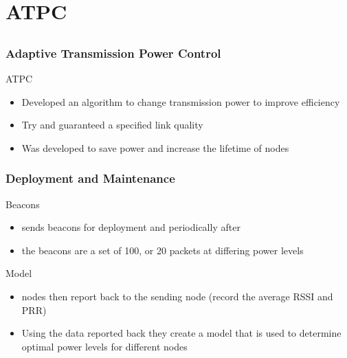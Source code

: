 \section{ATPC}
\subsection*{}


\begin{frame}[t]
  \frametitle{Adaptive Transmission Power Control}
  
  ATPC
  \begin{itemize}
  \item Developed an algorithm to change transmission power to improve efficiency
  \item Try and guaranteed a specified link quality
  \item Was developed to save power and increase the lifetime of nodes
  \end{itemize}

  \vfill

  \begin{flushleft}
    \begin{tiny}
      \begin{minipage}{1.0\linewidth}
      \end{minipage}
    \end{tiny}
  \end{flushleft}
  
\end{frame}

\begin{frame}[t]
  \frametitle{Deployment and Maintenance}

  Beacons
  \begin{itemize}
  \item sends beacons for deployment and periodically after
  \item the beacons are a set of 100, or 20 packets at differing power levels
  \end{itemize}

  Model
  \begin{itemize}
  \item nodes then report back to the sending node (record the average RSSI and PRR)
  \item Using the data reported back they create a model that is used to determine optimal power levels for different nodes
  \end{itemize}

  \vfill

  \begin{flushleft}
    \begin{tiny}
      \begin{minipage}{1.0\linewidth}
      \end{minipage}
    \end{tiny}
  \end{flushleft}
  
\end{frame}

